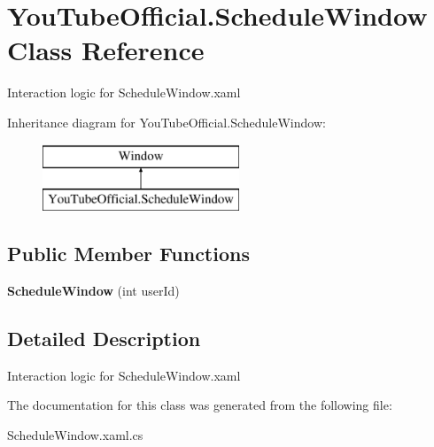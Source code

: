 \hypertarget{class_you_tube_official_1_1_schedule_window}{}\section{You\+Tube\+Official.\+Schedule\+Window Class Reference}
\label{class_you_tube_official_1_1_schedule_window}


Interaction logic for Schedule\+Window.\+xaml  


Inheritance diagram for You\+Tube\+Official.\+Schedule\+Window\+:\begin{figure}[H]
\begin{center}
\leavevmode
\includegraphics[height=2.000000cm]{class_you_tube_official_1_1_schedule_window}
\end{center}
\end{figure}
\subsection*{Public Member Functions}
\begin{DoxyCompactItemize}
\item 
\mbox{\label{class_you_tube_official_1_1_schedule_window_adde9f1456293a9ee7f2219580b448cb6}} 
{\bfseries Schedule\+Window} (int user\+Id)
\end{DoxyCompactItemize}


\subsection{Detailed Description}
Interaction logic for Schedule\+Window.\+xaml 



The documentation for this class was generated from the following file\+:\begin{DoxyCompactItemize}
\item 
Schedule\+Window.\+xaml.\+cs\end{DoxyCompactItemize}
